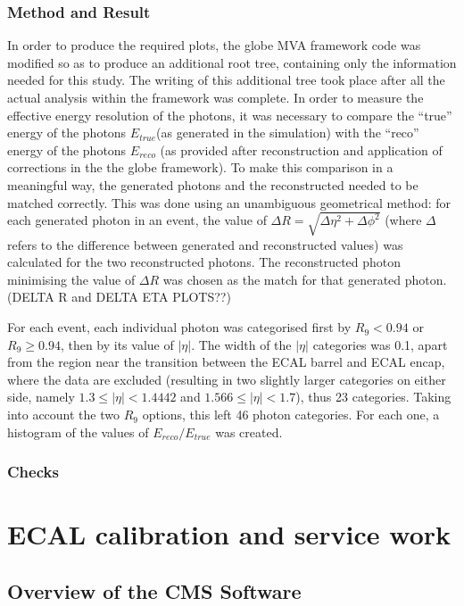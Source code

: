 \documentclass[10pt]{article}
\begin{document}
\subsubsection{Method and Result}

In order to produce the required plots, the globe MVA framework code was modified so as to produce an additional root tree, containing only the information needed for this study. The writing of this additional tree took place after all the actual analysis within the framework was complete. In order to measure the effective energy resolution of the photons, it was necessary to compare the ``true'' energy of the photons $E_{true}$(as generated in the simulation) with the ``reco'' energy of the photons $E_{reco}$ (as provided after reconstruction and application of corrections in the the globe framework). To make this comparison in a meaningful way, the generated photons and the reconstructed needed to be matched correctly. This was done using an unambiguous geometrical method: for each generated photon in an event, the value of $\Delta R = \sqrt{\Delta \eta^2 + \Delta \phi^2}$ (where $\Delta$ refers to the difference between generated and reconstructed values) was calculated for the two reconstructed photons. The reconstructed photon minimising the value of $\Delta R$ was chosen as the match for that generated photon. (DELTA R and DELTA ETA PLOTS??)

For each event, each individual photon was categorised first by $R_{9} <0.94$ or $R_{9} \geq 0.94$, then  by its value of $|\eta|$. The width of the $|\eta|$ categories was 0.1, apart from the region near the transition between the ECAL barrel and ECAL encap, where the data are excluded (resulting in two slightly larger categories on either side, namely $ 1.3 \leq |\eta| < 1.4442 $ and $1.566 \leq |\eta| < 1.7$), thus 23 categories. Taking into account the two $R_{9}$ options, this left 46 photon categories. For each one, a histogram of the values of $E_{reco}/E_{true}$ was created.

\subsubsection{Checks}




\newpage

\section{ECAL calibration and service work}
\subsection{Overview of the CMS Software}
\end{document}
